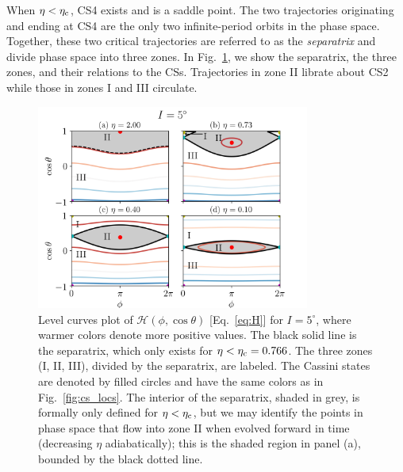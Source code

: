 \documentclass[
        fleqn,
        usenatbib,
    ]{mnras}
\newcommand*{\p}[1]{\left(#1\right)}
\begin{document}
When $\eta < \eta_{\rm c}$, CS4 exists and is a saddle point. The two
trajectories originating and ending at CS4 are the only two infinite-period
orbits in the phase space. Together, these two critical trajectories are
referred to as the \emph{separatrix} and divide phase space into three zones. In
Fig.~\ref{fig:eq_1contours}, we show the separatrix, the three zones, and their
relations to the CSs. Trajectories in zone II librate about CS2 while those in
zones I and III circulate.
\begin{figure}
    \centering
    \includegraphics[width=0.8\textwidth]{plots_diskdisp/1contours_flip.png}
    \caption{Level curves plot of $\mathcal{H}\p{\phi, \cos \theta}$
    [Eq.~\eqref{eq:H}] for $I = 5^\circ$, where warmer colors denote more
    positive values. The black solid line is the separatrix, which only exists
    for $\eta < \eta_{\rm c} = 0.766$. The three zones (I, II, III), divided by
    the separatrix, are labeled. The Cassini states are denoted by filled
    circles and have the same colors as in Fig.~\ref{fig:cs_locs}. The interior
    of the separatrix, shaded in grey, is formally only defined for $\eta <
    \eta_{\rm c}$, but we may identify the points in phase space that flow into
    zone II when evolved forward in time (decreasing $\eta$ adiabatically); this
    is the shaded region in panel (a), bounded by the black dotted
    line.}\label{fig:eq_1contours}
\end{figure}
\end{document}
